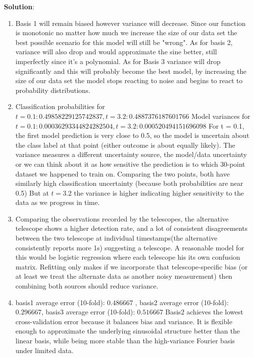 \documentclass[submit]{harvardml}
\newenvironment{solution}{
    \vspace{2mm}
    \color{blue}\noindent\textbf{Solution}:
}{}
\begin{document}
\begin{solution}
\begin{enumerate}
        \item Basis 1 will remain biased however variance will decrease. Since our function is monotonic no matter how much we increase the size of our data set the best possible scenario for this model will still be "wrong". As for basis 2, variance will also drop and would approximate the sine better, still imperfectly since it's a polynomial. As for Basis 3 variance will drop significantly and this will probably become the best model, by increasing the size of our data set the model stops reacting to noise and begins to react to probability distributions.
        \item Classification probabilities for  $t = 0.1: 0.49858229125742837, t = 3.2: 0.4887376187601766$
        Model variances for $ t = 0.1: 0.00036293344824282504, t = 3.2: 0.000520494151696098$
        For t = 0.1, the first model prediction is very close to 0.5, so the model is  uncertain about the class label at that point (either outcome is about equally likely). The variance measures a different uncertainty source, the model/data uncertainty or we can think about it as how sensitive the prediction is to which 30-point dataset we happened to train on. Comparing the two points, both have similarly high classification uncertainty (because both probabilities are near 0.5) But at $t=3.2$ the variance is higher indicating higher sensitivity to the data as we progress in time.
        \item Comparing the observations recorded by the telescopes, the alternative telescope shows a higher detection rate, and a lot of consistent disagreements between the two telescope at individual timestamps(the alternative consistently reports more 1s) suggesting a telescope. A reasonable model for this would be logistic regression where each telescope his its own confusion matrix. Refitting only makes if we incorporate that telescope-specific bias (or at least we treat the alternate data as another noisy measurement) then combining both sources should reduce variance.
        \item basis1 average error (10-fold): $0.486667$ , basis2 average error (10-fold): $0.296667$, basis3 average error (10-fold): $0.516667$
        Basis2 achieves the lowest cross-validation error because it balances bias and variance. It is flexible enough to approximate the underlying sinusoidal structure better than the linear basis, while being more stable than the high-variance Fourier basis under limited data.
	\end{enumerate}
\end{solution}
\end{document}

